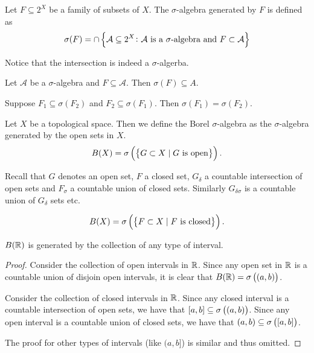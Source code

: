 \documentclass[11pt,a4paper]{article}
\newcommand{\A}{\mathcal A}
\begin{document}
\begin{example}
  Let $F \subseteq 2^X$ be a family of subsets of $X$.
  The $\sigma$-algebra generated by $F$ is defined as
  \[
    \sigma(F) = \cap \set{\mathcal A \subseteq 2^X \colon 
  \mathcal A \text{ is a $\sigma$-algebra} \text{ and }F \subset \mathcal A}
  \]
\end{example}
\begin{remark}
  Notice that the intersection is indeed a $\sigma$-algerba.
\end{remark}
\begin{remark}
  Let $\A$ be a $\sigma$-algebra and $F \subseteq \A$.
  Then $\sigma(F) \subseteq A$.
\end{remark}
\begin{corollary}
  Suppose $F_1 \subseteq \sigma(F_2)$ and $F_2 \subseteq \sigma(F_1)$.
  Then $\sigma(F_1) = \sigma(F_2)$.
\end{corollary}

\begin{definition}
  Let $X$ be a topological space.
  Then we define the Borel $\sigma$-algebra as the $\sigma$-algebra generated
  by the open sets in $X$.
  \[
    B(X) = \sigma\del{\set{G \subset X \mid G \text{ is open}}}.
  \]
\end{definition}
\begin{remark}
  Recall that $G$ denotes an open set, $F$ a closed set, $G_{\delta}$
  a countable intersection of open sets and $F_{\sigma}$ a countable
  union of closed sets.
  Similarly $G_{\delta \sigma}$ is a countable union of $G_{\delta}$ sets
  etc.
\end{remark}
\begin{remark}
  \[
    B(X) = \sigma\del{\set{F \subset X \mid F \text{ is closed}}}.
  \]
\end{remark}

\begin{proposition}
  $B(\mathbb{R})$ is generated by the collection of any type of interval.
\end{proposition}
\begin{proof}
  Consider the collection of open intervals in $\mathbb{R}$.
  Since any open set in $\mathbb{R}$ is a countable union of disjoin open intervals,
  it is clear that $B(\R) = \sigma\del{(a,b)}$.

  Consider the collection of closed intervals in $\mathbb{R}$.
  Since any closed interval is a countable intersection of open sets,
  we have that $[a,b] \subseteq \sigma\del{(a,b)}$.
  Since any open interval is a countable union of closed sets,
  we have that $(a,b) \subseteq \sigma\del{[a,b]}$.
  
  The proof for other types of intervals (like $(a,b]$) is similar and thus
  omitted.
\end{proof}
\end{document}
